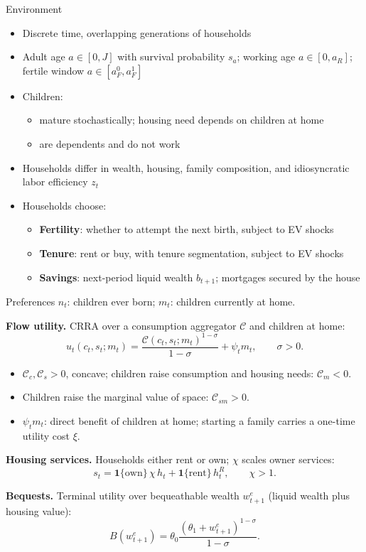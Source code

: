 \documentclass[11pt,aspectratio=169]{beamer}
\newcommand{\1}{\mathbf 1}
\begin{document}
\begin{frame}{Environment}
\begin{itemize}
  \item Discrete time, overlapping generations of households
  \item Adult age $a\in[0,J]$ with survival probability $s_a$; working age $a\in[0,a_R]$; fertile window $a\in[a_F^0,a_F^1]$
  \item Children:
  \begin{itemize}
    \item mature stochastically; housing need depends on children at home
    \item are dependents and do not work
  \end{itemize}
  \item Households differ in wealth, housing, family composition, and idiosyncratic labor efficiency $z_t$
  \item Households choose:
  \begin{itemize}
    \item \textbf{Fertility}: whether to attempt the next birth, subject to EV shocks
    \item \textbf{Tenure}: rent or buy, with tenure segmentation, subject to EV shocks
    \item \textbf{Savings}: next-period liquid wealth $b_{t+1}$; mortgages secured by the house
  \end{itemize}
\end{itemize}
\end{frame}

\begin{frame}{Preferences}
\footnotesize
\setlength{\abovedisplayskip}{2pt}\setlength{\belowdisplayskip}{2pt}
$n_t$: children ever born; $m_t$: children currently at home.

\smallskip
\textbf{Flow utility.} CRRA over a consumption aggregator $\mathcal C$ and children at home:
\[
u_t(c_t,s_t;m_t)=\frac{\mathcal C(c_t,s_t;m_t)^{1-\sigma}}{1-\sigma}+\psi_t m_t,\qquad \sigma>0.
\]
\begin{itemize}\setlength\itemsep{1pt}
  \item $\mathcal C_c,\mathcal C_s>0$, concave; children raise consumption and housing needs: $\mathcal C_m<0$.
  \item Children raise the marginal value of space: $\mathcal C_{sm}>0$.
  \item $\psi_t m_t$: direct benefit of children at home; starting a family carries a one-time utility cost $\xi$.
\end{itemize}

\smallskip
\textbf{Housing services.} Households either rent or own; $\chi$ scales owner services:
\[
s_t=\mathbf{1}\{\text{own}\}\,\chi\,h_t+\mathbf{1}\{\text{rent}\}\,h_t^R,\qquad \chi>1.
\]

\smallskip
\textbf{Bequests.} Terminal utility over bequeathable wealth $w^e_{t+1}$ (liquid wealth plus housing value):
\[
B(w_{t+1}^e)=\theta_0\frac{(\theta_1+w_{t+1}^e)^{1-\sigma}}{1-\sigma}.
\]
\end{frame}
\end{document}
